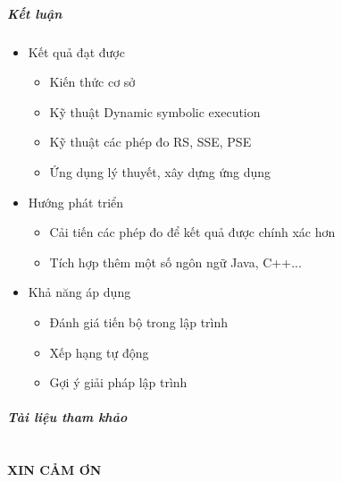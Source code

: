 \documentclass{beamer}
\begin{document}
\begin{frame}
  \frametitle{Kết luận}
	
  \begin{itemize}
  	\item Kết quả đạt được
  	\begin{itemize}
  		\item Kiến thức cơ sở
  		\item Kỹ thuật Dynamic symbolic execution
  		\item Kỹ thuật các phép đo RS, SSE, PSE
  		\item Ứng dụng lý thuyết, xây dựng ứng dụng
  	\end{itemize} \pause
  	\item Hướng phát triển
  	\begin{itemize}
  		\item Cải tiến các phép đo để kết quả được chính xác hơn
  		\item Tích hợp thêm một số ngôn ngữ Java, C++...
  	\end{itemize} \pause
  	\item Khả năng áp dụng
  	\begin{itemize}
  		\item Đánh giá tiến bộ trong lập trình
  		\item Xếp hạng tự động
  		\item Gợi ý giải pháp lập trình
  	\end{itemize}
  \end{itemize}
\end{frame}


\begin{frame}
  \frametitle{Tài liệu tham khảo}
  
  {\footnotesize}
\end{frame}


\part{}

\begin{frame}
  \begin{center}
    \begin{Huge}
      \textcolor{BlueGreen}{\textbf{XIN CẢM ƠN}}
    \end{Huge}
\end{center}

\end{frame}

\end{document}
